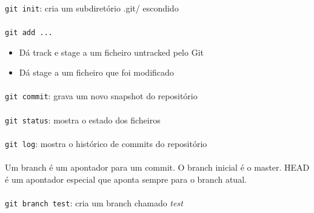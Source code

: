 \documentclass[../resumosLPOO.tex]{subfiles}
\begin{document}
\paragraph{}

\lstinline{git init}: cria um subdiretório .git/ escondido

\paragraph{}

\lstinline{git add ...}
\begin{itemize}
    \item Dá track e stage a um ficheiro untracked pelo Git
    \item Dá stage a um ficheiro que foi modificado
\end{itemize}

\paragraph{}

\lstinline{git commit}: grava um novo snapshot do repositório

\paragraph{}

\lstinline{git status}: mostra o estado dos ficheiros

\paragraph{}

\lstinline{git log}: mostra o histórico de commits do repositório

\paragraph{}

Um branch é um apontador para um commit. O branch inicial é o master. 
HEAD é um apontador especial que aponta sempre para o branch atual.

\paragraph{}

\lstinline{git branch test}: cria um branch chamado \emph{test}

\paragraph{}
\end{document}
